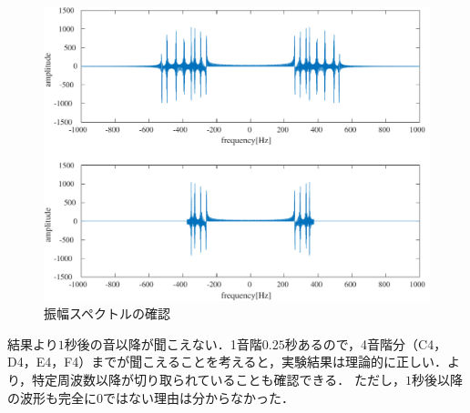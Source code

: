 \begin{figure}[h]
    \begin{minipage}[b]{.3\textwidth}
        \centering
        \includegraphics[keepaspectratio,width=\textwidth]{../../Figures/02_21.pdf}
        \caption{振幅スペクトルの確認}
        \label{fig:振幅スペクトルの確認}
    \end{minipage}
\end{figure}
\consideration
結果より\(1\)秒後の音以降が聞こえない．1音階\(0.25\)秒あるので，4音階分（C4，D4，E4，F4）までが聞こえることを考えると，実験結果は理論的に正しい．より，特定周波数以降が切り取られていることも確認できる．
ただし，\(1\)秒後以降の波形も完全に0ではない理由は分からなかった．
